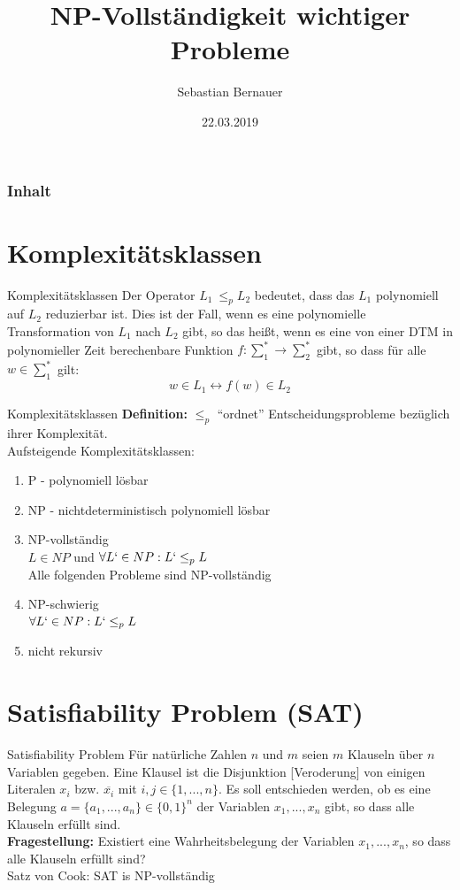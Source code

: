 \documentclass[12pt,donthandout,notes=dontshow,xcolor=table]{beamer}
\author{Sebastian Bernauer}
\title{NP-Vollständigkeit wichtiger Probleme}
\date{22.03.2019}
\begin{document}
\begin{frame}
\titlepage
\end{frame}

\begin{frame}[allowframebreaks]
\frametitle{Inhalt}
\tableofcontents
\end{frame}

\section{Komplexitätsklassen}
\begin{frame}{Komplexitätsklassen}
Der Operator $L_1\ \le_p L_2$ bedeutet, dass das $L_1$ polynomiell auf $L_2$ reduzierbar ist.
Dies ist der Fall, wenn es eine polynomielle Transformation von $L_1$ nach $L_2$ gibt, so das heißt, wenn es eine von einer DTM in polynomieller Zeit berechenbare Funktion $f: \sum_1^* \rightarrow \sum_2^*$ gibt, so dass für alle $w \in \sum_1^*$ gilt:
$$w \in L_1 \leftrightarrow f(w) \in L_2$$
\end{frame}

\begin{frame}{Komplexitätsklassen}
\textbf{Definition:} \(\leq_p\) ``ordnet'' Entscheidungsprobleme bezüglich ihrer Komplexität.\\
Aufsteigende Komplexitätsklassen:
\begin{enumerate}
\item P - polynomiell lösbar
\pause
\item NP - nichtdeterministisch polynomiell lösbar
\pause
\item NP-vollständig\\
\textrightarrow \(L \in NP\) und \(\forall L` \in NP: L` \leq_p L\)\\
\pause
\textrightarrow Alle folgenden Probleme sind NP-vollständig
\pause
\item NP-schwierig\\
\textrightarrow \(\forall L` \in NP: L` \leq_p L\)
\pause
\item nicht rekursiv
\end{enumerate}
\end{frame}

\section{Satisfiability Problem (SAT)}
\begin{frame}{Satisfiability Problem}
Für natürliche Zahlen \(n\) und \(m\) seien \(m\) Klauseln über \(n\) Variablen gegeben.
Eine Klausel ist die Disjunktion [Veroderung] von einigen Literalen \(x_i\) bzw. \(\overline{x_i}\) mit \(i,j \in \{1,...,n\}\). Es soll entschieden werden, ob es eine Belegung \(a = \{a_1,...,a_n\} \in \{0,1\}^n\) der Variablen \(x_1,...,x_n\) gibt, so dass alle Klauseln erfüllt sind.\\
\pause
\textbf{Fragestellung:} Existiert eine Wahrheitsbelegung der Variablen \(x_1,...,x_n\), so dass alle Klauseln erfüllt sind?\\
\pause
\textrightarrow Satz von Cook: SAT is NP-vollständig
\end{frame}
\end{document}
